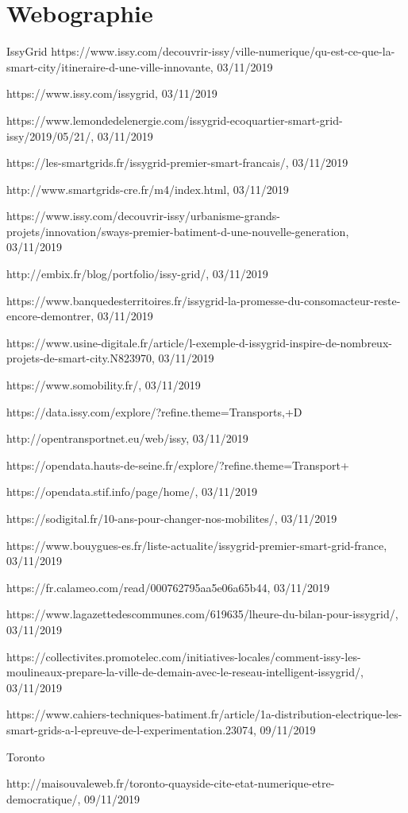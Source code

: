 \chapter*{Webographie}

IssyGrid
https://www.issy.com/decouvrir-issy/ville-numerique/qu-est-ce-que-la-smart-city/itineraire-d-une-ville-innovante, 03/11/2019

https://www.issy.com/issygrid, 03/11/2019

https://www.lemondedelenergie.com/issygrid-ecoquartier-smart-grid-issy/2019/05/21/, 03/11/2019

https://les-smartgrids.fr/issygrid-premier-smart-francais/, 03/11/2019

http://www.smartgrids-cre.fr/m4/index.html, 03/11/2019

https://www.issy.com/decouvrir-issy/urbanisme-grands-projets/innovation/sways-premier-batiment-d-une-nouvelle-generation, 03/11/2019

http://embix.fr/blog/portfolio/issy-grid/, 03/11/2019

https://www.banquedesterritoires.fr/issygrid-la-promesse-du-consomacteur-reste-encore-demontrer, 03/11/2019

https://www.usine-digitale.fr/article/l-exemple-d-issygrid-inspire-de-nombreux-projets-de-smart-city.N823970, 03/11/2019

https://www.somobility.fr/, 03/11/2019

https://data.issy.com/explore/?refine.theme=Transports,+D%

http://opentransportnet.eu/web/issy, 03/11/2019

https://opendata.hauts-de-seine.fr/explore/?refine.theme=Transport+%

https://opendata.stif.info/page/home/, 03/11/2019

https://sodigital.fr/10-ans-pour-changer-nos-mobilites/, 03/11/2019

https://www.bouygues-es.fr/liste-actualite/issygrid-premier-smart-grid-france, 03/11/2019

https://fr.calameo.com/read/000762795aa5e06a65b44, 03/11/2019

https://www.lagazettedescommunes.com/619635/lheure-du-bilan-pour-issygrid/, 03/11/2019

https://collectivites.promotelec.com/initiatives-locales/comment-issy-les-moulineaux-prepare-la-ville-de-demain-avec-le-reseau-intelligent-issygrid/, 03/11/2019

https://www.cahiers-techniques-batiment.fr/article/1a-distribution-electrique-les-smart-grids-a-l-epreuve-de-l-experimentation.23074, 09/11/2019

Toronto

http://maisouvaleweb.fr/toronto-quayside-cite-etat-numerique-etre-democratique/, 09/11/2019